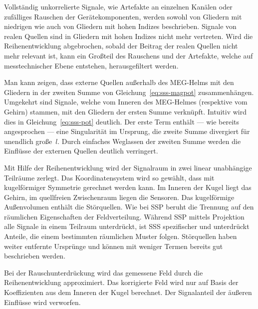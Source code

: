 \documentclass[doc,a4paper,12pt]{apa6}
\begin{document}
\begin{compactitem}
\item Vollständig unkorrelierte Signale, wie Artefakte an einzelnen Kanälen oder zufälliges Rauschen der Gerätekomponenten, werden sowohl von Gliedern mit niedrigen wie auch von Gliedern mit hohen Indizes beschrieben. Signale von realen Quellen sind in Gliedern mit hohen Indizes nicht mehr vertreten. Wird die Reihenentwicklung abgebrochen, sobald der Beitrag der realen Quellen nicht mehr relevant ist, kann ein Großteil des Rauschens und der Artefakte, welche auf messtechnischer Ebene entstehen, herausgefiltert werden.
\item Man kann zeigen, dass externe Quellen außerhalb des MEG-Helms mit den Gliedern in der zweiten Summe von Gleichung~\ref{eq:sss-magpot} zusammenhängen. Umgekehrt sind Signale, welche vom Inneren des MEG-Helmes (respektive vom Gehirn) stammen, mit den Gliedern der ersten Summe verknüpft. Intuitiv wird dies in Gleichung~\ref{eq:sss-pot} deutlich. Der erste Term enthält --- wie bereits angesprochen --- eine Singularität im Ursprung, die zweite Summe divergiert für unendlich große~$l$. Durch einfaches Weglassen der zweiten Summe werden die Einflüsse der externen Quellen deutlich verringert.
\end{compactitem}

Mit Hilfe der Reihenentwicklung wird der Signalraum in zwei linear unabhängige Teilräume zerlegt. Das Koordinatensystem wird so gewählt, dass mit kugelförmiger Symmetrie gerechnet werden kann. Im Inneren der Kugel liegt das Gehirn, im quellfreien Zwischenraum liegen die Sensoren. Das kugelförmige Außenvolumen enthält die Störquellen. Wie bei SSP beruht die Trennung auf den räumlichen Eigenschaften der Feldverteilung. Während SSP mittels Projektion alle Signale in einem Teilraum unterdrückt, ist SSS spezifischer und unterdrückt Anteile, die einem bestimmten räumlichen Muster folgen. Störquellen haben weiter entfernte Ursprünge und können mit weniger Termen bereits gut beschrieben werden.

Bei der Rauschunterdrückung wird das gemessene Feld durch die Reihenentwicklung approximiert. Das korrigierte Feld wird nur auf Basis der Koeffizienten aus dem Inneren der Kugel berechnet. Der Signalanteil der äußeren Einflüsse wird verworfen.

\end{document}
